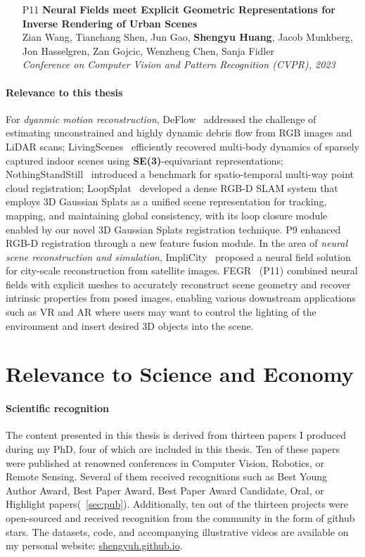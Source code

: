 \begin{itemize}
    \item [P11] \noindent\textbf{ Neural Fields meet Explicit Geometric Representations for Inverse Rendering of Urban Scenes} \\[0.5em]
    Zian Wang, Tianchang Shen, Jun Gao, \textbf{Shengyu Huang}, Jacob Munkberg, Jon Hasselgren, Zan Gojcic, Wenzheng Chen, Sanja Fidler \\
    \textit{Conference on Computer Vision and Pattern Recognition (CVPR), 2023}

\end{itemize}

\paragraph{Relevance to this thesis} For \textit{dyanmic motion reconstruction}, DeFlow~\cite{Zhu_2023_CVPR} addressed the challenge of estimating unconstrained and highly dynamic debris flow from RGB images and LiDAR scans; LivingScenes~\cite{zhu2023living} efficiently recovered multi-body dynamics of sparsely captured indoor scenes using \textbf{SE(3)}-equivariant representations; NothingStandStill~\cite{sun2023nothing} introduced a benchmark for spatio-temporal multi-way point cloud registration; LoopSplat~\cite{zhu2024_loopsplat} developed a dense RGB-D SLAM system that employs 3D Gaussian Splats as a unified scene representation for tracking, mapping, and maintaining global consistency, with its loop closure module enabled by our novel 3D Gaussian Splats registration technique. P9 enhanced RGB-D registration through a new feature fusion module. In the area of \textit{neural scene reconstruction and simulation}, ImpliCity~\cite{stucker2022implicity} proposed a neural field solution for city-scale reconstruction from satellite images. FEGR~\cite{wang2023fegr} (P11) combined neural fields with explicit meshes to accurately reconstruct scene geometry and recover intrinsic properties from posed images, enabling various downstream applications such as VR and AR where users may want to control the lighting of the environment and insert desired 3D objects into the scene.


\section{Relevance to Science and Economy}


\paragraph{Scientific recognition}
The content presented in this thesis is derived from thirteen papers I produced during my PhD, four of which are included in this thesis. Ten of these papers were published at renowned conferences in Computer Vision, Robotics, or Remote Sensing. Several of them received recognitions such as Best Young Author Award, Best Paper Award, Best Paper Award Candidate, Oral, or Highlight papers(\cf~\cref{sec:pub}). Additionally, ten out of the thirteen projects were open-sourced and received recognition from the community in the form of github stars. The datasets, code, and accompanying illustrative videos are available on my personal website: \url{shengyuh.github.io}.


